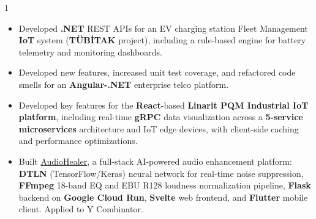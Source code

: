 \documentclass[11pt,a4paper]{altacv}
\begin{document}
\begin{paracol}{1}
\divider

\begin{itemize}
  \item Developed \textbf{.NET} REST APIs for an EV charging station Fleet Management \textbf{IoT} system (\textbf{TÜBİTAK} project), including a rule-based engine for battery telemetry and monitoring dashboards.
\end{itemize}

\divider

\begin{itemize}
  \item Developed new features, increased unit test coverage, and refactored code smells for an \textbf{Angular-.NET} enterprise telco platform.
\end{itemize}

\divider

\begin{itemize}
  \item Developed key features for the \textbf{React}-based \textbf{Linarit PQM Industrial IoT platform}, including real-time \textbf{gRPC} data visualization across a \textbf{5-service microservices} architecture and IoT edge devices, with client-side caching and performance optimizations.
\end{itemize}

\divider

\begin{itemize}
  \item Built \href{https://www.audiohealer.com}{AudioHealer}, a full-stack AI-powered audio enhancement platform: \textbf{DTLN} (TensorFlow/Keras) neural network for real-time noise suppression, \textbf{FFmpeg} 18-band EQ and EBU R128 loudness normalization pipeline, \textbf{Flask} backend on \textbf{Google Cloud Run}, \textbf{Svelte} web frontend, and \textbf{Flutter} mobile client. Applied to Y Combinator.
\end{itemize}


\end{paracol}
\end{document}
